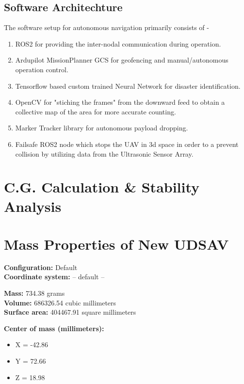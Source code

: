 \documentclass[12pt]{report}
\begin{document}
      \subsection{Software Architechture}
      The software setup for autonomous navigation primarily consists of - 
      \begin{enumerate}
        \item ROS2 for providing the inter-nodal communication during operation.
        \item Ardupilot MissionPlanner GCS for geofencing and manual/autonomous operation control.
        \item Tensorflow based custom trained Neural Network for disaster identification.
        \item OpenCV for "stiching the frames" from the downward feed to obtain a collective map of the area for more accurate counting.
        \item Marker Tracker library for autonomous payload dropping.
        \item Failsafe ROS2 node which stops the UAV in 3d space in order to a prevent collision by utilizing data from the Ultrasonic Sensor Array.
      \end{enumerate}
\newpage
    \section{C.G. Calculation \& Stability Analysis}
    \section*{Mass Properties of New UDSAV}

\textbf{Configuration:} Default  
\\
\textbf{Coordinate system:} -- default --  

\vspace{1em}
\textbf{Mass:} 734.38 grams  
\\
\textbf{Volume:} 686326.54 cubic millimeters  
\\
\textbf{Surface area:} 404467.91 square millimeters  

\vspace{1em}
\textbf{Center of mass (millimeters):}  
\begin{itemize}
  \item X = -42.86  
  \item Y = 72.66  
  \item Z = 18.98  
\end{itemize}
\end{document}
